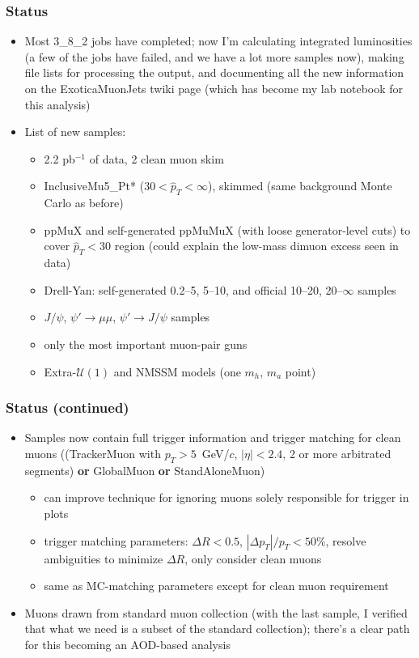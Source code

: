 \documentclass[compress]{beamer}
\begin{document}
\begin{frame}
\frametitle{Status}
\begin{itemize}
\item Most 3\_8\_2 jobs have completed; now I'm calculating integrated luminosities (a few of the jobs have failed, and we have a lot more samples now), making file lists for processing the output, and documenting all the new information on the ExoticaMuonJets twiki page (which has become my lab notebook for this analysis)
\item List of new samples:
\begin{itemize}
\item 2.2 pb$^{-1}$ of data, 2 clean muon skim
\item InclusiveMu5\_Pt* ($30 < \hat{p}_T < \infty$), skimmed (same background Monte Carlo as before)
\item ppMuX and self-generated ppMuMuX (with loose generator-level cuts) to cover $\hat{p}_T < 30$ region (could explain the low-mass dimuon excess seen in data)
\item Drell-Yan: self-generated 0.2--5, 5--10, and official 10--20, 20--$\infty$ samples
\item $J/\psi$, $\psi' \to \mu\mu$, $\psi' \to J/\psi$ samples
\item only the most important muon-pair guns
\item Extra-$\mathcal{U}(1)$ and NMSSM models (one $m_h$, $m_a$ point)
\end{itemize}
\end{itemize}
\end{frame}

\begin{frame}
\frametitle{Status (continued)}
\begin{itemize}
\item Samples now contain full trigger information and trigger matching for clean muons ((TrackerMuon with $p_T > 5$~GeV/$c$, $|\eta| < 2.4$, 2 or more arbitrated segments) {\bf or} GlobalMuon {\bf or} StandAloneMuon)
\begin{itemize}
\item can improve technique for ignoring muons solely responsible for trigger in plots
\item trigger matching parameters: $\Delta R < 0.5$, $|\Delta p_T|/p_T < 50\%$, resolve ambiguities to minimize $\Delta R$, only consider clean muons
\item same as MC-matching parameters except for clean muon requirement
\end{itemize}

\item Muons drawn from standard muon collection (with the last sample, I verified that what we need is a subset of the standard collection); there's a clear path for this becoming an AOD-based analysis
\end{itemize}
\end{frame}
\end{document}
